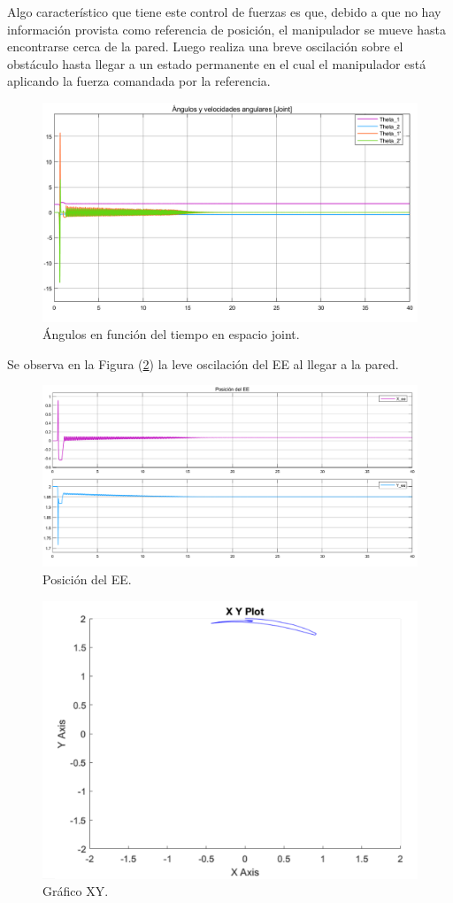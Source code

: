 Algo característico que tiene este control de fuerzas es que, debido a que no hay información provista como referencia de posición, el manipulador se mueve hasta encontrarse cerca de la pared. Luego realiza una breve oscilación sobre el obstáculo hasta llegar a un estado permanente en el cual el manipulador está aplicando la fuerza comandada por la referencia.

\begin{figure}[H]
	\centering
	\includegraphics[width=0.8\linewidth]{ImagenesControl de fuerza no lineal/2_3_a}
	\caption{\'Angulos en función del tiempo en espacio joint.}	
	\label{fig:athetas_f}
\end{figure}

Se observa en la Figura (\ref{fig:apos_f}) la leve oscilación del EE al llegar a la pared.

\begin{figure}[H]
	\centering
	\includegraphics[width=0.8\linewidth]{ImagenesControl de fuerza no lineal/2_3_b}
	\caption{Posición  del EE.}	
	\label{fig:apos_f}
\end{figure}

\begin{figure}[H]
	\centering
	\includegraphics[width=0.5\linewidth]{ImagenesControl de fuerza no lineal/2_3_c}
	\caption{Gráfico XY.}	
	\label{fig:axy_f}
\end{figure}

